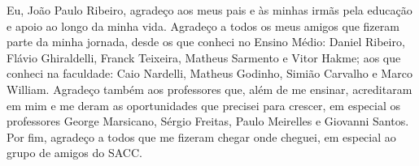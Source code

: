 \begin{agradecimentos}
Eu, João Paulo Ribeiro, agradeço aos meus pais e às minhas irmãs pela educação e apoio ao longo da minha vida. Agradeço a todos os meus amigos que fizeram parte da minha jornada, desde os que conheci no Ensino Médio: Daniel Ribeiro, Flávio Ghiraldelli, Franck Teixeira, Matheus Sarmento e Vitor Hakme; aos que conheci na faculdade: Caio Nardelli, Matheus Godinho, Simião Carvalho e Marco William. Agradeço também aos professores que, além de me ensinar, acreditaram em mim e me deram as oportunidades que precisei para crescer, em especial os professores George Marsicano, Sérgio Freitas, Paulo Meirelles e Giovanni Santos. Por fim, agradeço a todos que me fizeram chegar onde cheguei, em especial ao grupo de amigos do SACC.
\end{agradecimentos}
